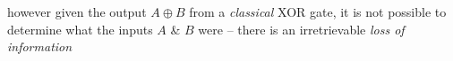 \documentclass[preview]{standalone}
\begin{document}
\begin{center}
however given the output $A \oplus B$ from a \textit{classical} XOR gate, it is not possible to determine what the inputs $A$ \& $B$ were -- there is an irretrievable \textit{loss of information}
\end{center}
\end{document}
